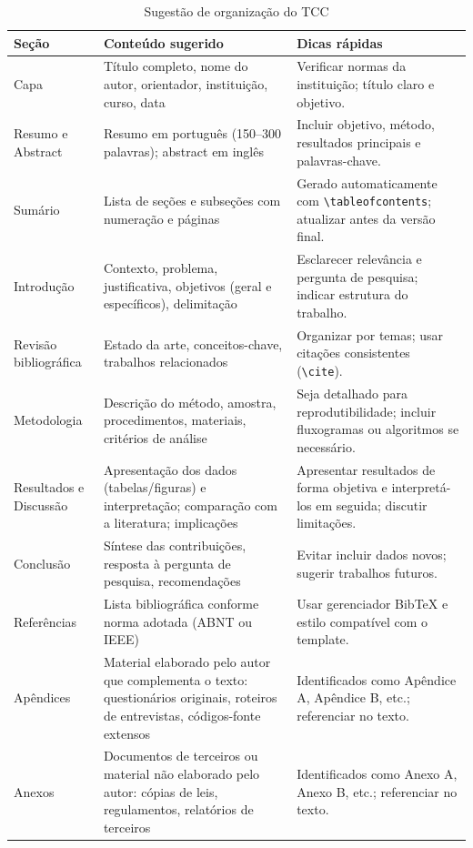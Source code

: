 \begin{table}[ht]
\centering
\caption{Sugestão de organização do TCC}
\label{tab:organizacao_tcc}
\begin{tabular}{p{3cm} p{6.5cm} p{5.5cm}}
\hline
\textbf{Seção} & \textbf{Conteúdo sugerido} & \textbf{Dicas rápidas} \\
\hline
Capa & Título completo, nome do autor, orientador, instituição, curso, data & Verificar normas da instituição; título claro e objetivo. \\
Resumo e Abstract & Resumo em português (150–300 palavras); abstract em inglês & Incluir objetivo, método, resultados principais e palavras-chave. \\
Sumário & Lista de seções e subseções com numeração e páginas & Gerado automaticamente com \verb|\tableofcontents|; atualizar antes da versão final. \\
Introdução & Contexto, problema, justificativa, objetivos (geral e específicos), delimitação & Esclarecer relevância e pergunta de pesquisa; indicar estrutura do trabalho. \\
Revisão bibliográfica & Estado da arte, conceitos-chave, trabalhos relacionados & Organizar por temas; usar citações consistentes (\verb|\cite|). \\
Metodologia & Descrição do método, amostra, procedimentos, materiais, critérios de análise & Seja detalhado para reprodutibilidade; incluir fluxogramas ou algoritmos se necessário. \\
Resultados e Discussão & Apresentação dos dados (tabelas/figuras) e interpretação; comparação com a literatura; implicações & Apresentar resultados de forma objetiva e interpretá-los em seguida; discutir limitações. \\
Conclusão & Síntese das contribuições, resposta à pergunta de pesquisa, recomendações & Evitar incluir dados novos; sugerir trabalhos futuros. \\
Referências & Lista bibliográfica conforme norma adotada (ABNT ou IEEE) & Usar gerenciador BibTeX e estilo compatível com o template. \\
Apêndices & Material elaborado pelo autor que complementa o texto: questionários originais, roteiros de entrevistas, códigos-fonte extensos & Identificados como Apêndice A, Apêndice B, etc.; referenciar no texto. \\
Anexos & Documentos de terceiros ou material não elaborado pelo autor: cópias de leis, regulamentos, relatórios de terceiros & Identificados como Anexo A, Anexo B, etc.; referenciar no texto. \\
\hline
\end{tabular}
\end{table}
